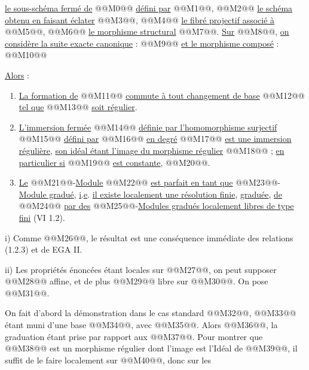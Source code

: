 
\uline{le sous-schéma fermé de} @@M0@@ \uline{défini par} @@M1@@, @@M2@@ \uline{le schéma obtenu en faisant éclater} @@M3@@, @@M4@@ \uline{le fibré projectif associé à} @@M5@@, @@M6@@ \uline{le morphisme structural} @@M7@@. \uline{Sur} @@M8@@, \uline{on considère la suite exacte canonique} :
@@M9@@
\uline{et le morphisme composé} :
@@M10@@

\uline{Alors} :
\begin{enumerate}[label=\roman*)]
\item \uline{La formation de} @@M11@@ \uline{commute à tout changement de base} @@M12@@ \uline{tel que} @@M13@@ \uline{soit régulier}.
\item \uline{L'immersion fermée} @@M14@@ \uline{définie par l'homomorphisme surjectif} @@M15@@ \uline{défini par} @@M16@@ \uline{en degré} @@M17@@ \uline{est une immersion régulière}, \uline{son idéal étant l'image du morphisme régulier} @@M18@@ ; \uline{en particulier si} @@M19@@ \uline{est constante}, @@M20@@.
\item \uline{Le} @@M21@@-\uline{Module} @@M22@@ \uline{est parfait en tant que} @@M23@@-\uline{Module gradué}, \uline{i}.\uline{e}. \uline{il existe localement une résolution finie}, \uline{graduée}, \uline{de} @@M24@@ \uline{par des} @@M25@@-\uline{Modules gradués localement libres de type fini} (VI 1.2).
\end{enumerate}

i) Comme @@M26@@, le résultat est une conséquence immédiate des relations (1.2.3) et de EGA II.

ii) Les propriétés énoncées étant locales sur @@M27@@, on peut supposer @@M28@@ affine, et de plus @@M29@@ libre sur @@M30@@. On pose @@M31@@.

On fait d'abord la démonstration dans le cas standard @@M32@@, @@M33@@ étant muni d'une base @@M34@@, avec @@M35@@. Alors @@M36@@, la graduation étant prise par rapport aux @@M37@@. Pour montrer que @@M38@@ est un morphisme régulier dont l'image est l'Idéal de @@M39@@, il suffit de le faire localement sur @@M40@@, donc sur les
